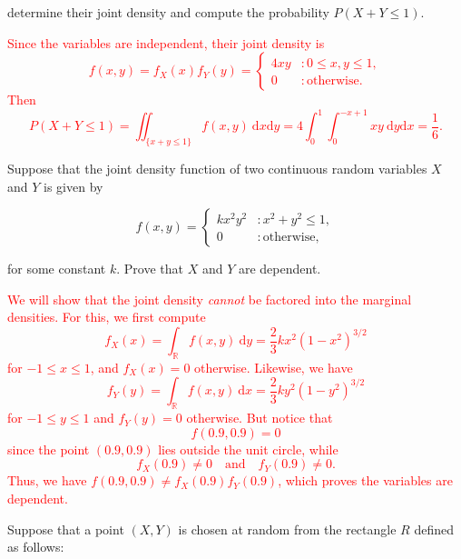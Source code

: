 \documentclass[12pt,reqno]{amsart}
\begin{document}
determine their joint density and compute the probability $P(X + Y \leq 1)$.

\bigskip
\textcolor{red}{Since the variables are independent, their joint density is
	\[f(x,y) = f_X(x) f_Y(y) =  \begin{cases}
	4xy & : 0 \leq x,y \leq 1, \\
	0 & : \text{otherwise}.
	\end{cases}
	\]
Then
	\[P(X+Y \leq 1) = \iint_{\{x+y\leq 1\}} f(x,y) \ \text{d}x\text{d}y = 4\int_0^1 \int_{0}^{-x+1} xy \ \text{d}y\text{d}x = \frac{1}{6}.
	\]}
\bigskip
	
	
	
	
	
















\prob Suppose that the joint density function of two continuous random variables $X$ and $Y$ is given by

	\[
	f(x,y) = \begin{cases}
	k x^2y^2 & : x^2+y^2 \leq 1, \\
	0 & : \text{otherwise},
	\end{cases}
	\]
	
for some constant $k$. Prove that $X$ and $Y$ are dependent.

\bigskip
\textcolor{red}{We will show that the joint density \textit{cannot} be factored into the marginal densities. For this, we first compute
	\[
	f_X(x) = \int_{\mathbb{R}} f(x,y) \ \text{d}y = \frac{2}{3} k x^2 \left(1-x^2\right)^{3/2}
	\]
for $-1\leq x \leq 1$, and $f_X(x) = 0$ otherwise. Likewise, we have
	\[
	f_Y(y) = \int_{\mathbb{R}} f(x,y) \ \text{d} x = \frac{2}{3} k y^2 \left(1-y^2\right)^{3/2}
	\]
for $-1 \leq y \leq 1$ and $f_Y(y)=0$ otherwise. But notice that
	\[
	f(0.9, 0.9) = 0
	\]
since the point $(0.9,0.9)$ lies outside the unit circle, while
	\[
	f_X(0.9)\neq 0 \quad \text{and} \quad f_Y(0.9) \neq 0.
	\]
Thus, we have $f(0.9,0.9) \neq f_X(0.9) f_Y(0.9)$, which proves the variables are dependent.}
\bigskip












\prob Suppose that a point $(X, Y )$ is chosen at random from the rectangle $R$ defined as follows:
\end{document}
